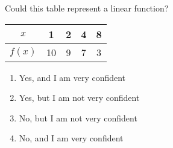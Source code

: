 \bigskip

\item Could this table represent a linear function?

\begin{tabular}{|c|c|c|c|c|}
\hline
$x$ & 1 & 2 & 4 & 8 \\
\hline
$f(x)$ & 10 & 9 & 7 & 3 \\
\hline
\end{tabular}

\begin{enumerate}
\item Yes, and I am very confident  
\item Yes, but I am not very confident
\item No, but I am not very confident
\item No, and I am very confident  
\end{enumerate}

